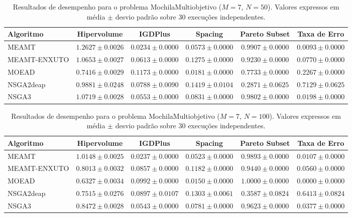 \begin{table}[htpb]
\centering
\caption{Resultados de desempenho para o problema MochilaMultiobjetivo ($M=7$, $N=50$). Valores expressos em média $\pm$ desvio padrão sobre 30 execuções independentes.}
\label{tab:MochilaMultiobjetivo_M7_N50}
\begin{tabular}{lccccc}
\hline\hline
Algoritmo & Hipervolume & IGDPlus & Spacing & Pareto Subset & Taxa de Erro \\
\hline
MEAMT & $1.2627 \pm 0.0026$ & $0.0234 \pm 0.0000$ & $0.0573 \pm 0.0000$ & $0.9907 \pm 0.0000$ & $0.0093 \pm 0.0000$ \\
MEAMT-ENXUTO & $1.0653 \pm 0.0027$ & $0.0613 \pm 0.0000$ & $0.1275 \pm 0.0000$ & $0.9230 \pm 0.0000$ & $0.0770 \pm 0.0000$ \\
MOEAD & $0.7416 \pm 0.0029$ & $0.1173 \pm 0.0000$ & $0.0181 \pm 0.0000$ & $0.7733 \pm 0.0000$ & $0.2267 \pm 0.0000$ \\
NSGA2deap & $0.9881 \pm 0.0248$ & $0.0788 \pm 0.0090$ & $0.1419 \pm 0.0104$ & $0.2871 \pm 0.0625$ & $0.7129 \pm 0.0625$ \\
NSGA3 & $1.0719 \pm 0.0028$ & $0.0553 \pm 0.0000$ & $0.0831 \pm 0.0000$ & $0.9802 \pm 0.0000$ & $0.0198 \pm 0.0000$ \\
\hline\hline
\end{tabular}
\end{table}

\begin{table}[htpb]
\centering
\caption{Resultados de desempenho para o problema MochilaMultiobjetivo ($M=7$, $N=100$). Valores expressos em média $\pm$ desvio padrão sobre 30 execuções independentes.}
\label{tab:MochilaMultiobjetivo_M7_N100}
\begin{tabular}{lccccc}
\hline\hline
Algoritmo & Hipervolume & IGDPlus & Spacing & Pareto Subset & Taxa de Erro \\
\hline
MEAMT & $1.0148 \pm 0.0025$ & $0.0237 \pm 0.0000$ & $0.0523 \pm 0.0000$ & $0.9893 \pm 0.0000$ & $0.0107 \pm 0.0000$ \\
MEAMT-ENXUTO & $0.8013 \pm 0.0032$ & $0.0857 \pm 0.0000$ & $0.1182 \pm 0.0000$ & $0.9440 \pm 0.0000$ & $0.0560 \pm 0.0000$ \\
MOEAD & $0.6327 \pm 0.0034$ & $0.0992 \pm 0.0000$ & $0.0150 \pm 0.0000$ & $1.0000 \pm 0.0000$ & $0.0000 \pm 0.0000$ \\
NSGA2deap & $0.7515 \pm 0.0276$ & $0.0897 \pm 0.0107$ & $0.1303 \pm 0.0061$ & $0.3587 \pm 0.0824$ & $0.6413 \pm 0.0824$ \\
NSGA3 & $0.8472 \pm 0.0028$ & $0.0543 \pm 0.0000$ & $0.0781 \pm 0.0000$ & $0.9623 \pm 0.0000$ & $0.0377 \pm 0.0000$ \\
\hline\hline
\end{tabular}
\end{table}

